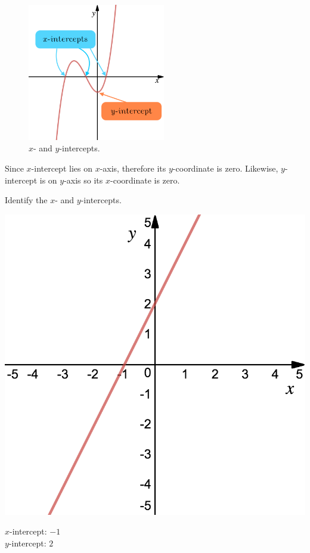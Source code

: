 \begin{figure}[ht]
	\centering
    \includegraphics[width=6cm]{pics/intercept.png}
    \caption{$x$- and $y$-intercepts.}
\end{figure}

Since $x$-intercept lies on $x$-axis, therefore its $y$-coordinate is zero. 
Likewise, $y$-intercept is on $y$-axis so its $x$-coordinate is zero.
\newpage
\begin{exa}
    Identify the $x$- and $y$-intercepts.
\end{exa}
\noindent\begin{minipage}{0.3\textwidth}
\includegraphics[width=\linewidth]{pics/ex1.png}
\end{minipage}%
\hfill%
\begin{minipage}{0.6\textwidth}
$x$-intercept: $-1$ \\
$y$-intercept: $2$
\end{minipage}


